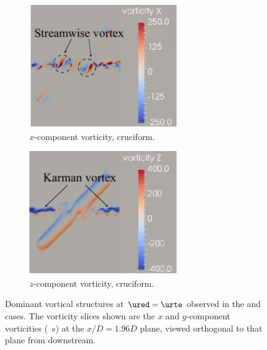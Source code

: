 \documentclass[a4paper,fleqn]{cas-sc}
\begin{document}
\begin{figure}
  \begin{subfigure}[h]{0.4\textwidth}
    \centering
    \includegraphics[width=0.7\textwidth]{figs/vorx45}
    \caption{$x$-component vorticity, \angth{} cruciform.}
    \label{fig:vorx45}
  \end{subfigure}
  \begin{subfigure}[h]{0.4\textwidth}
    \centering
    \includegraphics[width=0.7\textwidth]{figs/vorz45}
    \caption{$z$-component vorticity, \angth{} cruciform.}
    \label{fig:vorz45}
  \end{subfigure}

  \caption{Dominant vortical structures at $\ured = \urte$ observed in the \angfo{} and \angth{} cases. The vorticity slices shown are the $x$ and $y$-component vorticities (\si{\per\second}) at the $x/D = 1.96D$ plane, viewed orthogonal to that plane from downstream.} \label{fig:vortStruct67545}
\end{figure}
\end{document}
